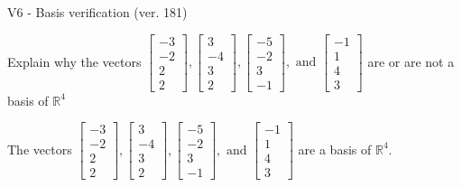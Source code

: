 \begin{exercise}
  \begin{exerciseTitle}V6 - Basis verification (ver. 181)\end{exerciseTitle}
  \begin{exerciseStatement}
    Explain why the vectors \(\left[\begin{array}{r}
-3 \\
-2 \\
2 \\
2
\end{array}\right] , \left[\begin{array}{r}
3 \\
-4 \\
3 \\
2
\end{array}\right] , \left[\begin{array}{r}
-5 \\
-2 \\
3 \\
-1
\end{array}\right] , \text{ and } \left[\begin{array}{r}
-1 \\
1 \\
4 \\
3
\end{array}\right]\) are or are not a basis of \(\mathbb{R}^4\)	


  \end{exerciseStatement}
  \begin{exerciseAnswer}
   The vectors \(\left[\begin{array}{r}
-3 \\
-2 \\
2 \\
2
\end{array}\right] , \left[\begin{array}{r}
3 \\
-4 \\
3 \\
2
\end{array}\right] , \left[\begin{array}{r}
-5 \\
-2 \\
3 \\
-1
\end{array}\right] , \text{ and } \left[\begin{array}{r}
-1 \\
1 \\
4 \\
3
\end{array}\right]\) 
  	 are  a basis of \(\mathbb{R}^4\).
  


  \end{exerciseAnswer}
\end{exercise}